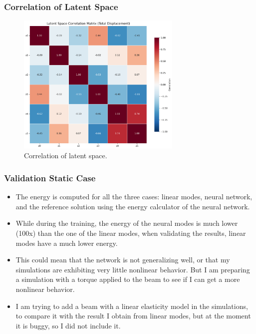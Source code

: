 \documentclass{beamer}
\begin{document}

\begin{frame}
    \frametitle{Correlation of Latent Space}
    
    \begin{figure}
        \centering
        \includegraphics[width=0.7\textwidth]{Images/latent_correlations_total_total.png}
        \caption{Correlation of latent space.}
        \label{fig:latent_correlation}

    \end{figure}
\end{frame}








\begin{frame}
    \frametitle{Validation Static Case}
    
    \begin{itemize}
        \item The energy is computed for all the three cases: linear modes, neural network, and the reference solution using the energy calculator of the neural network.
        \item While during the training, the energy of the neural modes is much lower (100x) than the one of the linear modes, when validating the results, linear modes have a much lower energy.
        \item This could mean that the network is not generalizing well, or that my simulations are exhibiting very little nonlinear behavior. But I am preparing a simulation with a torque applied to the beam to see if I can get a more nonlinear behavior.
        \item I am trying to add a beam with a linear elasticity model in the simulations, to compare it with the result I obtain from linear modes, but at the moment it is buggy, so I did not include it.
    \end{itemize}
\end{frame}
\end{document}
